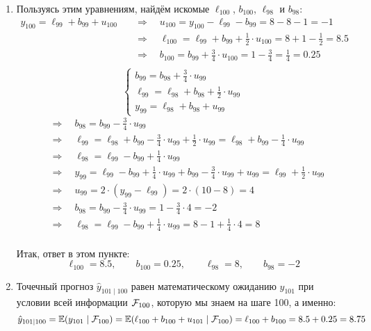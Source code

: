 \begin{problem}
\begin{sol}
  \begin{enumerate}
    \item Пользуясь этим уравнениям, найдём искомые $\ell_{100}$, $b_{100}$, $\ell_{98}$ и $b_{98}$:
  \begin{align*}
      y_{100} = \ell_{99} + b_{99} + u_{100} \quad &\Rightarrow \quad u_{100} = y_{100} - \ell_{99} - b_{99} = 8 - 8 - 1 = -1 \\
      &\Rightarrow \quad \ell_{100} = \ell_{99} + b_{99} + \frac{1}{2} \cdot u_{100} = 8 + 1 - \frac{1}{2} = 8.5 \\
      &\Rightarrow \quad b_{100} = b_{99} + \frac{3}{4} \cdot u_{100} = 1 - \frac{3}{4} = \frac{1}{4} = 0.25\\
  \end{align*}
  \[
      \begin{cases}
          b_{99} = b_{98} + \frac{3}{4} \cdot u_{99} \\
          \ell_{99} = \ell_{98} + b_{98} + \frac{1}{2} \cdot u_{99} \\
          y_{99} = \ell_{98} + b_{98} + u_{99}
      \end{cases}
  \]
  \begin{align*}
      &\Rightarrow \quad b_{98} = b_{99} - \frac{3}{4} \cdot u_{99} \\
      &\Rightarrow \quad \ell_{99} = \ell_{98} + b_{99} - \frac{3}{4} \cdot u_{99} + \frac{1}{2} \cdot u_{99} =  \ell_{98} + b_{99} - \frac{1}{4} \cdot u_{99} \\
      &\Rightarrow \quad \ell_{98} = \ell_{99} - b_{99} + \frac{1}{4} \cdot u_{99} \\
      &\Rightarrow \quad y_{99} = \ell_{99} - b_{99} + \frac{1}{4} \cdot u_{99} + b_{99} - \frac{3}{4} \cdot u_{99} + u_{99} = \ell_{99} + \frac{1}{2} \cdot u_{99} \\
      &\Rightarrow \quad u_{99} = 2 \cdot (y_{99} - \ell_{99}) = 2 \cdot (10 - 8) = 4 \\
      &\Rightarrow \quad b_{98} = b_{99} - \frac{3}{4} \cdot u_{99} = 1 - \frac{3}{4} \cdot 4 = -2 \\
      &\Rightarrow \quad \ell_{98} = \ell_{99} - b_{99} + \frac{1}{4} \cdot u_{99} = 8 - 1 + \frac{1}{4} \cdot 4 = 8\\
  \end{align*}
  
  Итак, ответ в этом пункте:
  \[
      \ell_{100} = 8.5, \qquad b_{100} = 0.25, \qquad \ell_{98} = 8, \qquad b_{98} = -2
  \]
  
  \item  Точечный прогноз $\hat{y}_{101 \mid 100}$ равен математическому ожиданию $y_{101}$ 
  при условии всей информации $\mathcal{F}_{100}$, которую мы знаем на шаге 100, а именно:
  \[
      \hat{y}_{101 \mid 100} = \operatorname{\mathbb{E}}(y_{101} \mid \mathcal{F}_{100}) = \operatorname{\mathbb{E}}(\ell_{100} + b_{100} + u_{101}\mid \mathcal{F}_{100}) = \ell_{100} + b_{100} = 8.5 + 0.25 = 8.75
  \]
  

\end{enumerate}
\end{sol}
\end{problem}

